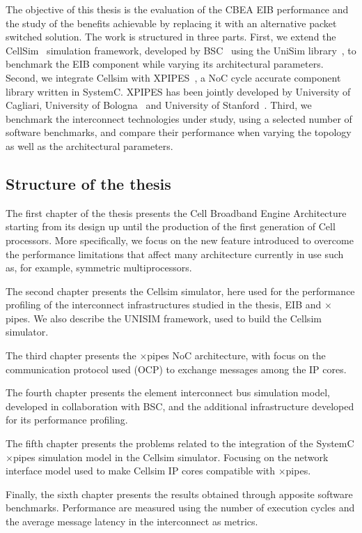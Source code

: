 The objective of this thesis is the evaluation of the CBEA EIB performance and the study of the benefits achievable by replacing it with an alternative packet switched solution. The work is structured in three parts. First, we extend the CellSim~\cite{Cellsim} simulation framework, developed by BSC~\cite{BSC} using the UniSim library~\cite{Unisim}, to benchmark the EIB component while varying its architectural parameters. Second, we integrate Cellsim with XPIPES~\cite{XPIPES}, a NoC cycle accurate component library written in SystemC. XPIPES has been jointly developed by University of Cagliari, University of Bologna~\cite{Bologna} and University of Stanford~\cite{Stanford}. Third, we benchmark the interconnect technologies under study, using a selected number of software benchmarks, and compare their performance when varying the topology as well as the architectural parameters.

\subsection*{Structure of the thesis}
The first chapter of the thesis presents the Cell Broadband Engine Architecture starting from its design up until the production of the first generation of Cell processors. More specifically, we focus on the new feature introduced to overcome the performance limitations that affect many architecture currently in use such as, for example, symmetric multiprocessors. 

The second chapter presents the Cellsim simulator, here used for the performance profiling of the interconnect infrastructures studied in the thesis, EIB and $\times$pipes. We also describe the UNISIM framework, used to build the Cellsim simulator.

The third chapter presents the $\times$pipes NoC architecture, with focus on the communication protocol used (OCP) to exchange messages among the IP cores.

The fourth chapter presents the element interconnect bus simulation model, developed in collaboration with BSC, and the additional infrastructure developed for its performance profiling. 

The fifth chapter presents the problems related to the integration of the SystemC $\times$pipes simulation model in the Cellsim simulator. Focusing on the network interface model used to make Cellsim IP cores compatible with $\times$pipes.

Finally, the sixth chapter presents the results obtained through apposite software benchmarks. Performance are measured using the number of execution cycles and the average message latency in the interconnect as metrics. 
